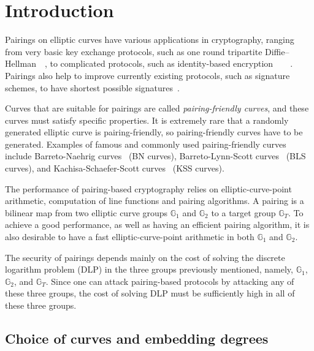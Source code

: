 \section{Introduction}
\label{sec:intro}

Pairings on elliptic curves have various applications in cryptography,
ranging from very basic key exchange protocols,
such as one round tripartite Diffie--Hellman~\cite{2000/joux-ants}~\cite{2004/joux-tripartite},
to complicated protocols, such as
identity-based encryption~\cite{2001/boneh}~\cite{2002/horwitz}~\cite{2002/gentry}~\cite{2005/sahai}.
Pairings also help to improve currently existing protocols, 
such as signature schemes, to have shortest possible signatures~\cite{2004/boneh}.

Curves that are suitable for pairings are called {\emph{pairing-friendly curves}},
and these curves must satisfy specific properties.
It is extremely rare that a randomly generated elliptic curve is pairing-friendly,
so pairing-friendly curves have to be generated.
Examples of famous and commonly used pairing-friendly curves include 
Barreto-Naehrig curves~\cite{2006/barreto} (BN curves),
Barreto-Lynn-Scott curves~\cite{2003/bls} (BLS curves), and
Kachisa-Schaefer-Scott curves~\cite{2008/kss} (KSS curves).

The performance of pairing-based cryptography relies on
elliptic-curve-point arithmetic, computation of line functions and pairing algorithms.
A pairing is a bilinear map from two elliptic curve groups $\mathbb{G}_1$ and $\mathbb{G}_2$ to
a target group $\mathbb{G}_T$.
To achieve a good performance, as well as having an efficient pairing algorithm,
it is also desirable to have a fast elliptic-curve-point arithmetic in both $\mathbb{G}_1$ and $\mathbb{G}_2$.

The security of pairings depends mainly on the cost of solving the discrete logarithm problem (DLP) in the three groups previously mentioned,
namely, $\mathbb{G}_1$, $\mathbb{G}_2$, and $\mathbb{G}_T$.
Since one can attack pairing-based protocols by attacking any of these three groups,
the cost of solving DLP must be sufficiently high in all of these three groups.


\subsection{Choice of curves and embedding degrees}

